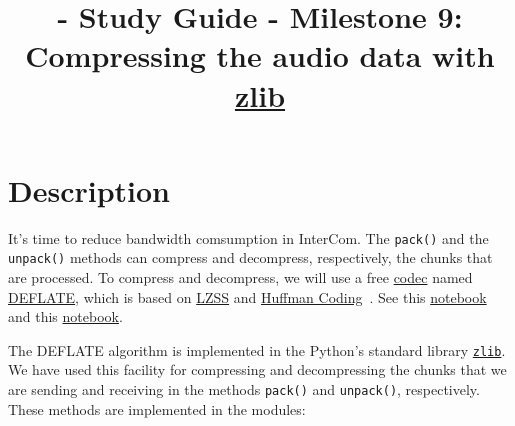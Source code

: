 
\title{\TM{} - Study Guide - Milestone 9: Compressing the audio data with \href{https://zlib.net/}{zlib}}

\maketitle

\section{Description}

It's time to reduce bandwidth comsumption in InterCom. The
\verb|pack()| and the \verb|unpack()| methods can compress and
decompress, respectively, the chunks that are processed. To compress
and decompress, we will use a free
\href{https://en.wikipedia.org/wiki/Codec}{codec} named
\href{https://en.wikipedia.org/wiki/DEFLATE}{DEFLATE}, which is based
on
\href{https://en.wikipedia.org/wiki/Lempel%E2%80%93Ziv%E2%80%93Storer%E2%80%93Szymanski}{LZSS}
  and \href{https://en.wikipedia.org/wiki/Huffman_coding}{Huffman
    Coding}~\cite{nelson96datacompression}. See this
  \href{https://github.com/vicente-gonzalez-ruiz/LZ77}{notebook} and
  this
  \href{https://vicente-gonzalez-ruiz.github.io/Huffman_coding/}{notebook}.

The DEFLATE algorithm is implemented in the Python's standard library
\href{https://docs.python.org/3/library/zlib.html}{\texttt{zlib}}. We
have used this facility for compressing and decompressing the chunks
that we are sending and receiving in the methods \verb|pack()| and
\verb|unpack()|, respectively. These methods are implemented in the
modules:

